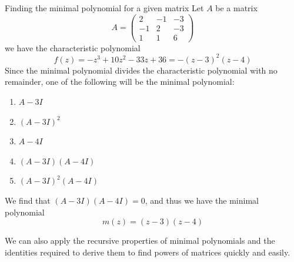 \documentclass[journal, letterpaper]{IEEEtran}
\begin{document}
    \begin{myboxg}{Finding the minimal polynomial for a given matrix}
        Let $A$ be a matrix
        $$ A = \begin{pmatrix}
            2 & -1 & -3 \\ -1 & 2 & -3 \\ 1 & 1 & 6
        \end{pmatrix}$$
        we have the characteristic polynomial
        $$ f(z) = -z^3 + 10z^2 - 33z + 36 = -(z - 3)^2(z-4)$$
        Since the minimal polynomial divides the characteristic polynomial with no remainder, one of the 
        following will be the minimal polynomial:
        \begin{enumerate}
            \item $A - 3I$
            \item $(A-3I)^2$
            \item $A - 4I$
            \item $(A-3I)(A-4I)$
            \item $(A-3I)^2(A-4I)$
        \end{enumerate}
        We find that $(A - 3I)(A - 4I) = 0$, and thus we have the minimal polynomial
        $$ m(z) = (z-3)(z-4)$$
    \end{myboxg}
    We can also apply the recursive properties of minimal polynomials and the identities required to derive them
    to find powers of matrices quickly and easily.
\end{document}
